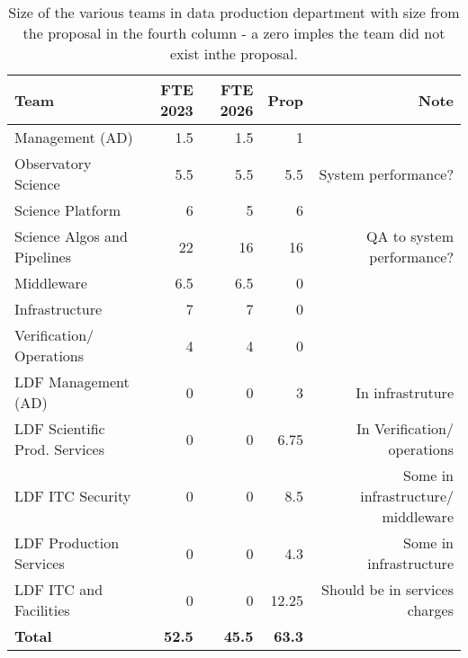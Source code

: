  \begin{longtable} { |p{}  |r  |r  |r  |r |} 
\caption{Size of the various teams in data production department with size from the proposal in the fourth column - a zero imples the team did not exist inthe proposal. \label{tab:FTE}}\\ 
\hline 
\textbf{Team}&\textbf{FTE 2023}&\textbf{FTE 2026}&\textbf{Prop}&\textbf{Note} \\ \hline
{Management (\gls{AD})}&{1.5}&{1.5}&{1}& \\ \hline
{Observatory Science }&{5.5}&{5.5}&{5.5}&{System performance?} \\ \hline
{Science Platform}&{6}&{5}&{6}& \\ \hline
{Science Algos and Pipelines}&{22}&{16}&{16}&{QA  to system performance?} \\ \hline
{Middleware}&{6.5}&{6.5}&{0}& \\ \hline
{Infrastructure}&{7}&{7}&{0}&{ } \\ \hline
{Verification/ Operations}&{4}&{4}&{0}& \\ \hline
{LDF Management (\gls{AD}) }&{0}&{0}&{3}&{In infrastruture} \\ \hline
{LDF Scientific Prod. Services}&{0}&{0}&{6.75}&{In Verification/ operations} \\ \hline
{LDF \gls{ITC} Security}&{0}&{0}&{8.5}&{Some in infrastructure/ middleware } \\ \hline
{LDF Production Services}&{0}&{0}&{4.3}&{Some in infrastructure} \\ \hline
{LDF \gls{ITC} and Facilities}&{0}&{0}&{12.25}&{Should be in services charges} \\ \hline
\textbf{Total}&\textbf{52.5}&\textbf{45.5}&\textbf{63.3}& \\ \hline
\end{longtable}
